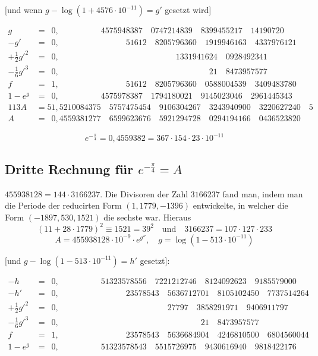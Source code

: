 \documentclass[10pt,a4paper]{article}
\begin{document}
[und wenn $g-\log(1+4576\cdot10^{-11})=g'$ gesetzt wird]

\begin{align*}
g &= \phantom{0}0{,}\phantom{0000000000}4575948387\quad 0747214839\quad 8399455217\quad 14190720\\
-g' &= \phantom{0}0{,}\phantom{0000000000000000}51612\quad 8205796360\quad 1919946163\quad 4337976121\\
+\tfrac12g'^2 &= \phantom{0}0{,}\phantom{0000000000000000000000000000}1331941624\quad 0928492341\\
-\tfrac16g'^3 &= \phantom{0}0{,}\phantom{000000000000000000000000000000000000}21\quad 8473957577\\
f &= \phantom{0}1{,}\phantom{0000000000000000}51612\quad 8205796360\quad 0588004539\quad 3409483780\\
1-e^g &= \phantom{0}0{,}\phantom{0000000000}4575978387\quad 1794180021\quad 9145023046\quad 2961445343\\
113A &= 51{,}5210084375\quad 5757475454\quad 9106304267\quad 3243940900\quad 3220627240\quad 5\\
A &= \phantom{0}0{,}4559381277\quad 6599623676\quad 5921294728\quad 0294194166\quad 0436523820
\end{align*}

\[
e^{-\frac{\pi}{4}} = 0{,}4559382 = 367\cdot154\cdot23\cdot10^{-11}
\]

\subsection*{Dritte Rechnung für \texorpdfstring{$e^{-\frac{\pi}{4}}=A$}{e\^{}(-pi/4)=A}}

$455938128 = 144\cdot3166237$. Die Divisoren der Zahl $3166237$ fand man,
indem man die Periode der reducirten Form $(1, 1779, -1396)$ entwickelte, in
welcher die Form $(-1897, 530, 1521)$ die sechste war. Hieraus
\[
(11+28\cdot1779)^2 \equiv 1521 = 39^2 \quad \text{und} \quad 3166237 = 107\cdot127\cdot233
\]
\[
A = 455938128\cdot10^{-9}\cdot e^{g''}, \quad g=\log(1-513\cdot10^{-11})
\]

[und $g-\log(1-513\cdot10^{-11})=h'$ gesetzt]:

\begin{align*}
-h &= \phantom{0}0{,}\phantom{0000000000}51323578556\quad 7221212746\quad 8124092623\quad 9185579000\\
-h'&= \phantom{0}0{,}\phantom{0000000000000000}23578543\quad 5636712701\quad 8105102450\quad 7737514264\\
+\tfrac12g'^2 &= \phantom{0}0{,}\phantom{00000000000000000000000000}27797\quad 3858291971\quad 9406911797\\
-\tfrac16g'^3 &= \phantom{0}0{,}\phantom{0000000000000000000000000000000000}21\quad 8473957577\\
f &= \phantom{0}1{,}\phantom{0000000000000000}23578543\quad 5636684904\quad 4246810500\quad 6804560044\\
1-e^g &= \phantom{0}0{,}\phantom{0000000000}51323578543\quad 5515726975\quad 9430616940\quad 9818422176
\end{align*}
\end{document}
